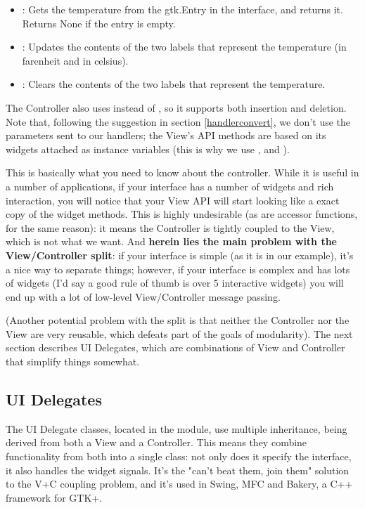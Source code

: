 \documentclass[a4paper]{howto}
\begin{document}
\begin{itemize}
\item {}: Gets the temperature from the gtk.Entry in the
interface, and returns it. Returns None if the entry is empty.
\item {}: Updates the contents of the two labels that
represent the temperature (in farenheit and in celsius).
\item {}: Clears the contents of the two labels that
represent the temperature.
\end{itemize}

The Controller also uses  instead of ,
so it supports both insertion and deletion. Note that, following the
suggestion in section \ref{handlerconvert}, we don't use the parameters
sent to our handlers; the View's API methods are based on its widgets
attached as instance variables (this is why we use
,  and ).

This is basically what you need to know about the controller. While it
is useful in a number of applications, if your interface has a number of
widgets and rich interaction, you will notice that your View API will
start looking like a exact copy of the widget methods. This is highly
undesirable (as are accessor functions, for the same reason): it means
the Controller is tightly coupled to the View, which is not what we
want. And {\bf herein lies the main problem with the View/Controller
split}: if your interface is simple (as it is in our example), it's a
nice way to separate things; however, if your interface is complex and
has lots of widgets (I'd say a good rule of thumb is over 5 interactive
widgets) you will end up with a lot of low-level View/Controller message
passing.

(Another potential problem with the split is that neither the Controller
nor the View are very reusable, which defeats part of the goals of
modularity). The next section describes UI Delegates, which are
combinations of View and Controller that simplify things somewhat.

\subsection{UI Delegates}

The UI Delegate classes, located in the  module, use
multiple inheritance, being derived from both a View and a Controller.
This means they combine functionality from both into a single class: not
only does it specify the interface, it also handles the widget signals.
It's the "can't beat them, join them" solution to the V+C coupling
problem, and it's used in Swing, MFC and Bakery, a C++ framework for
GTK+.
\end{document}
